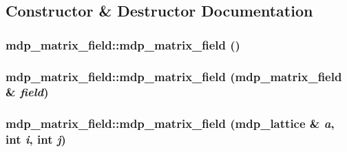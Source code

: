 \subsection{Constructor \& Destructor Documentation}
\hypertarget{classmdp__matrix__field_adebb4692eba7a0f92450e227a1b28ca3}{
\subsubsection[{mdp\_\-matrix\_\-field}]{\setlength{\rightskip}{0pt plus 5cm}mdp\_\-matrix\_\-field::mdp\_\-matrix\_\-field ()}}
\label{classmdp__matrix__field_adebb4692eba7a0f92450e227a1b28ca3}
\hypertarget{classmdp__matrix__field_aadbe032bb53bdd590d21a19ec43ad2cd}{
\subsubsection[{mdp\_\-matrix\_\-field}]{\setlength{\rightskip}{0pt plus 5cm}mdp\_\-matrix\_\-field::mdp\_\-matrix\_\-field ({\bf mdp\_\-matrix\_\-field} \& {\em field})}}
\label{classmdp__matrix__field_aadbe032bb53bdd590d21a19ec43ad2cd}
\hypertarget{classmdp__matrix__field_a970b03a7754e8c1e402afc9596502098}{
\subsubsection[{mdp\_\-matrix\_\-field}]{\setlength{\rightskip}{0pt plus 5cm}mdp\_\-matrix\_\-field::mdp\_\-matrix\_\-field ({\bf mdp\_\-lattice} \& {\em a}, \/  int {\em i}, \/  int {\em j})}}
\label{classmdp__matrix__field_a970b03a7754e8c1e402afc9596502098}



